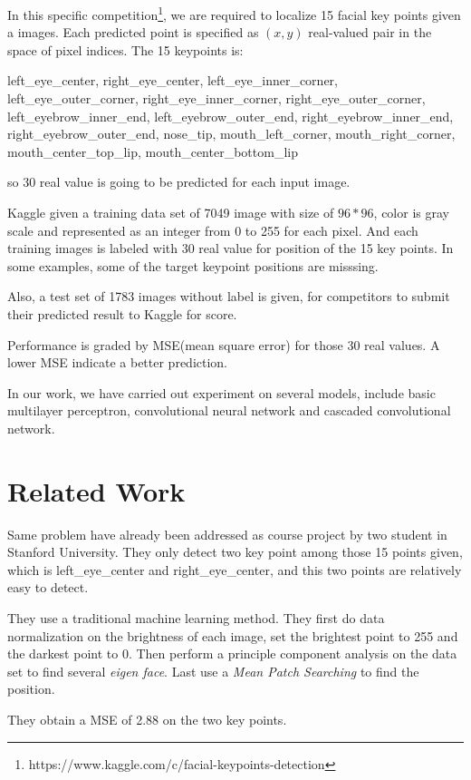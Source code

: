 \documentclass[10pt,twocolumn,letterpaper]{article}
\begin{document}
In this specific competition\footnote{https://www.kaggle.com/c/facial-keypoints-detection}, 
we are required to localize 15 facial key points given a images. Each predicted point
is specified as $(x,y)$ real-valued pair in the space of pixel indices.
The 15 keypoints is: 

left\_eye\_center, right\_eye\_center, left\_eye\_inner\_corner, left\_eye\_outer\_corner, right\_eye\_inner\_corner, right\_eye\_outer\_corner, left\_eyebrow\_inner\_end, left\_eyebrow\_outer\_end, right\_eyebrow\_inner\_end, right\_eyebrow\_outer\_end, nose\_tip, mouth\_left\_corner, mouth\_right\_corner, mouth\_center\_top\_lip, mouth\_center\_bottom\_lip

so 30 real value is going to be predicted for each input image.

Kaggle given a training data set of 7049 image with size of $96*96$,
color is gray scale and represented as an integer from 0 to 255 for each
pixel. And each training images is labeled with 30 real value for position of the 
15 key points. In some examples, some of the target keypoint positions are misssing.

Also, a test set of 1783 images without label is given, for competitors to submit their
predicted result to Kaggle for score.

Performance is graded by MSE(mean square error) for those 30 real values. A lower
MSE indicate a better prediction.

In our work, we have carried out experiment on several models, include basic multilayer
perceptron, convolutional neural network and cascaded convolutional network.


\section{Related Work}
Same problem have already been addressed as course project by two student in
Stanford University\cite{wangfacial}. They only detect two key point among those 15
points given, which is left\_eye\_center and right\_eye\_center, and this two points are
relatively easy to detect.

They use a traditional machine learning method. They first do data normalization on
the brightness of each image, set the brightest point to 255 and the darkest point to 0.
Then perform a principle component analysis on the data set to find several \emph{eigen face}.
Last use a \emph{Mean Patch Searching} to find the position.

They obtain a MSE of 2.88 on the two key points.
\end{document}
